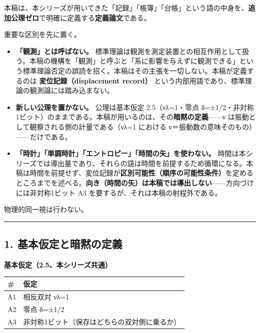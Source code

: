 \documentclass[
]{ltjsarticle}
\newcounter{none} %
\providecommand{\tightlist}{%
  \setlength{\itemsep}{0pt}\setlength{\parskip}{0pt}}
\begin{document}
本稿は、本シリーズが用いてきた「記録」「帳簿」「台帳」という語の中身を、\textbf{追加公理ゼロ}で明確に定義する\textbf{定義論文}である。

重要な区別を先に置く。

\begin{itemize}
\tightlist
\item
  \textbf{「観測」とは呼ばない。}
  標準理論は観測を測定装置との相互作用として扱う。本稿の機構を「観測」と呼ぶと「系に影響を与えずに観測できる」という標準理論否定の誤読を招く。本稿はその主張を一切しない。本稿が定義するのは
  \textbf{変位記録（displacement record）}
  という内部用語であり、標準理論の観測論には踏み込まない。
\item
  \textbf{新しい公理を置かない。} 公理は基本仮定 2.5（νλ=1・零点
  δ=±1/2・非対称1ビット）のままである。本稿が用いるのは、その\textbf{暗黙の定義}------ν
  は振動として観察される側の計量である（νλ=1 における
  ν＝振動数の意味そのもの）------だけである。
\item
  \textbf{「時計」「単調時計」「エントロピー」「時間の矢」を使わない。}
  時間は本シリーズでは導出量であり、それらの語は時間を前提するため循環になる。本稿は時間を前提せず、変位記録が\textbf{区別可能性（順序の可能性条件）}を定めるところまでを述べる。\textbf{向き（時間の矢）は本稿では導出しない}------方向づけには非対称1ビット
  A3 を要するが、それは本稿の射程外である。
\end{itemize}

物理的同一視は行わない。

\begin{center}\rule{0.5\linewidth}{0.5pt}\end{center}

\subsection{1.
基本仮定と暗黙の定義}\label{ux57faux672cux4eeeux5b9aux3068ux6697ux9ed9ux306eux5b9aux7fa9}

\textbf{基本仮定（2.5、本シリーズ共通）}

{\def\LTcaptype{none} %
\begin{longtable}[]{@{}ll@{}}
\toprule\noalign{}
\# & 仮定 \\
\midrule\noalign{}
\endhead
\bottomrule\noalign{}
\endlastfoot
A1 & 相反双対 νλ=1 \\
A2 & 零点 δ=±1/2 \\
A3 & 非対称1ビット（保存はどちらの双対側に乗るか） \\
\end{longtable}
}
\end{document}
